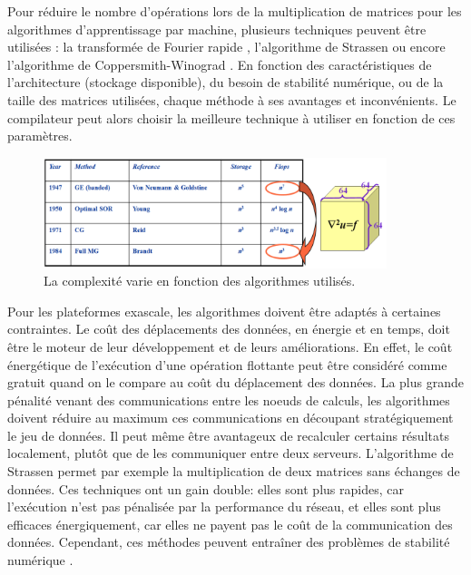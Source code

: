             Pour réduire le nombre d’opérations lors de la multiplication de matrices pour les algorithmes d’apprentissage par machine, plusieurs techniques peuvent être utilisées \cite{Sze2017}: la transformée de Fourier rapide \cite{Vasilache2014}, l’algorithme de Strassen \cite{Cong2014} ou encore l'algorithme de Coppersmith-Winograd \cite{Li2016}. En fonction des caractéristiques de l’architecture (stockage disponible), du besoin de stabilité numérique, ou de la taille des matrices utilisées, chaque méthode à ses avantages et inconvénients. Le compilateur peut alors choisir la meilleure technique à utiliser en fonction de ces paramètres.
    
            \begin{figure}
            \center
            \includegraphics[width=10cm]{images/edl_new_algo.png}
            \caption{\label{fig:edl_new_algo} La complexité varie en fonction des algorithmes utilisés\protect\footnotemark.}
            \end{figure}

            Pour les plateformes exascale, les algorithmes doivent être adaptés à certaines contraintes. Le coût des déplacements des données, en énergie et en temps, doit être le moteur de leur développement et de leurs améliorations. En effet, le coût énergétique de l'exécution d’une opération flottante peut être considéré comme gratuit quand on le compare au coût du déplacement des données. La plus grande pénalité venant des communications entre les noeuds de calculs, les algorithmes doivent réduire au maximum ces communications en découpant stratégiquement le jeu de données. Il peut même être avantageux de recalculer certains résultats localement, plutôt que de les communiquer entre deux serveurs. L'algorithme de Strassen \cite{Lipshitz2012} permet par exemple la multiplication de deux matrices sans échanges de données. Ces techniques ont un gain double: elles sont plus rapides, car l’exécution n’est pas pénalisée par la performance du réseau, et elles sont plus efficaces énergiquement, car elles ne payent pas le coût de la communication des données. Cependant, ces méthodes peuvent entraîner des problèmes de stabilité numérique \cite{khabou2013dense}. 
                        

